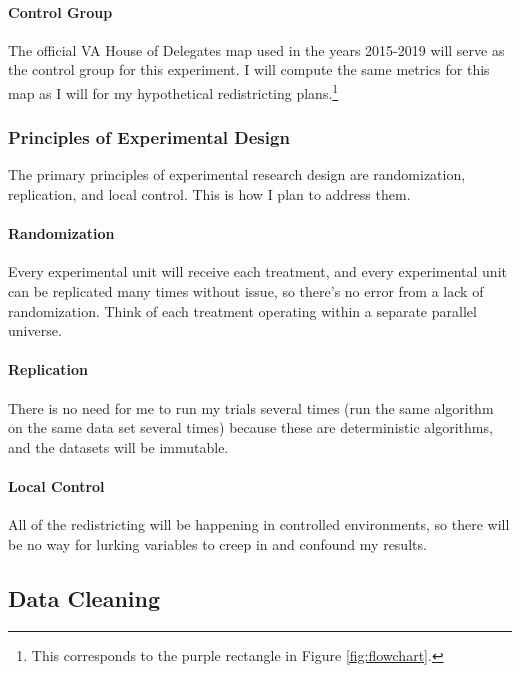 \paragraph{Control Group}

The official VA House of Delegates map used in the years 2015-2019 will serve as the control group for this experiment. I will compute the same metrics for this map as I will for my hypothetical redistricting plans.\footnote{This corresponds to the purple rectangle in Figure \ref{fig:flowchart}.}

\subsubsection{Principles of Experimental Design}

The primary principles of experimental research design are randomization, replication, and local control. This is how I plan to address them. 

\paragraph{Randomization}

Every experimental unit will receive each treatment, and every experimental unit can be replicated many times without issue, so there’s no error from a lack of randomization. Think of each treatment operating within a separate parallel universe. 

\paragraph{Replication}

There is no need for me to run my trials several times (run the same algorithm on the same data set several times) because these are deterministic algorithms, and the datasets will be immutable. 

\paragraph{Local Control}

All of the redistricting will be happening in controlled environments, so there will be no way for lurking variables to creep in and confound my results. 

\subsection{Data Cleaning}

